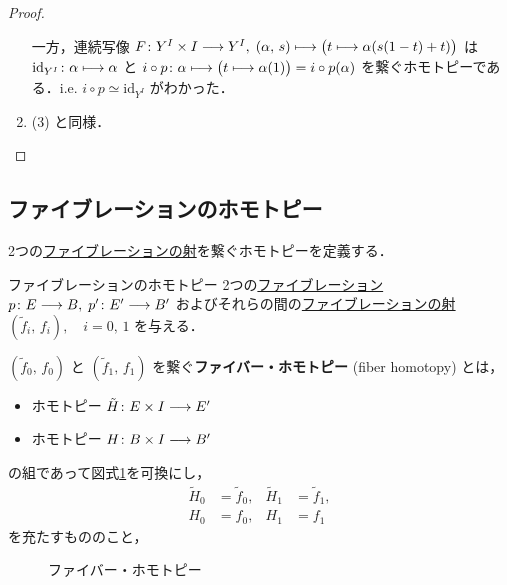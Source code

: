 \documentclass[algtopo_main]{subfiles}
\begin{document}
\begin{proof}
\begin{enumerate}
        一方，連続写像 $F \colon Y^I \times I \longrightarrow Y^I,\; (\alpha,\, s) \longmapsto \bigl(t \longmapsto \alpha(s(1-t) + t)\bigr)$ は
        $\mathrm{id}_{Y^I} \colon \alpha \longmapsto \alpha$ と $i\circ p \colon \alpha \longmapsto \bigl(t \longmapsto \alpha(1)\bigr) = i \circ p(\alpha)$ を繋ぐホモトピーである．i.e. $i \circ p \simeq \mathrm{id}_{Y^I}$ がわかった．
        \item (3) と同様．
    \end{enumerate}
    
\end{proof}

\subsection{ファイブレーションのホモトピー}

2つの\hyperref[def:fib-morphism]{ファイブレーションの射}を繋ぐホモトピーを定義する．

\begin{mydef}[label=def:fib-homotopy]{ファイブレーションのホモトピー}
    2つの\hyperref[def:fibration]{ファイブレーション} $p\colon E \longrightarrow B,\; p' \colon E' \longrightarrow B'$ 
    およびそれらの間の\hyperref[def:fib-morphism]{ファイブレーションの射} $(\tilde{f}_i,\, f_i),\quad i = 0,\, 1$ を与える．

    $(\tilde{f}_0,\, f_0)$ と $(\tilde{f}_1,\, f_1)$ を繋ぐ\textbf{ファイバー・ホモトピー} (fiber homotopy) とは，
    \begin{itemize}
        \item ホモトピー $\tilde{H} \colon E \times I \longrightarrow E'$
        \item ホモトピー $H \colon B \times I \longrightarrow B'$
    \end{itemize}
    の組であって図式\ref{cmtd:fib-homotopy}を可換にし，
    \begin{align}
        \tilde{H}_0 &= \tilde{f}_0, & \tilde{H}_1 &= \tilde{f}_1, \\
        H_0 &= f_0, & H_1 &= f_1
    \end{align}
    を充たすもののこと，
\end{mydef}

\begin{figure}[H]
    \centering
    \caption{ファイバー・ホモトピー}
    \label{cmtd:fib-homotopy}
\end{figure}%
\end{document}
